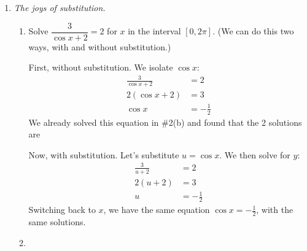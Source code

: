 \documentclass[main]{subfiles}
\begin{document}
\begin{enumerate}
\begin{enumerate}
  \end{enumerate}

\item  \emph{The joys of substitution.}


  \begin{enumerate}
  \item


    \begin{problem}[\vfill]
      Solve $\dfrac{3}{\cos x +2} = 2$ for $x$ in the interval $[0,2\pi]$. (We can do
      this two ways, with and without substitution.)
    \end{problem}

    \begin{solution}
      First, without substitution. We isolate $\cos x$:
      \begin{align*}
        \frac{3}{\cos x + 2} &= 2 \\
        2(\cos x + 2) &= 3 \\
        \cos x &= -\tfrac{1}{2}
      \end{align*}
      We already solved this equation in \#2(b) and found that the 2 solutions
      are 

      Now, with substitution. Let's substitute $u=\cos x$. We then solve for $y$:
      \begin{align*}
        \frac{3}{u + 2} &= 2 \\
        2(u + 2) &= 3 \\
        u &= -\tfrac{1}{2}
      \end{align*}
      Switching back to $x$, we have the same equation $\cos x=-\frac{1}{2}$, with
      the same solutions.
    \end{solution}
    
  \item


\end{enumerate}
\end{enumerate}
\end{document}
